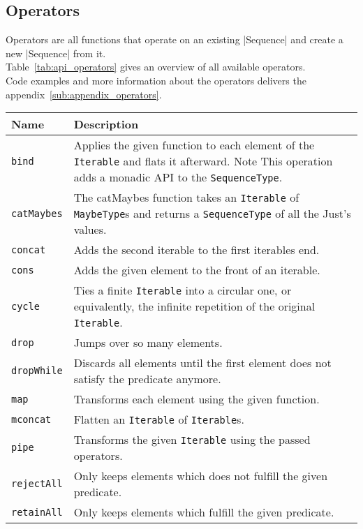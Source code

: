 \subsection{Operators} %
\label{sub:Operators}
Operators are all functions that operate on an existing |Sequence| and create a
new |Sequence| from it. \\
Table~\ref{tab:api_operators} gives an overview of all available operators.\\
Code examples and more information about the operators delivers the
appendix~\ref{sub:appendix_operators}.
\begin{table}[H]
  \centering
  \begin{tabularx}{\textwidth}{| l | X |} \hline
    \textbf{Name} & \textbf{Description} \\ \hline
    \texttt{bind} & Applies the given function to each element of the \texttt{Iterable} and flats it afterward. Note This operation adds a monadic API to the \texttt{SequenceType}. \\ \hline 
    \texttt{catMaybes} & The catMaybes function takes an \texttt{Iterable} of \texttt{MaybeType}s and returns a \texttt{SequenceType} of all the Just's values. \\ \hline 
    \texttt{concat} & Adds the second iterable to the first iterables end. \\ \hline 
    \texttt{cons} & Adds the given element to the front of an iterable. \\ \hline 
    \texttt{cycle} & Ties a finite \texttt{Iterable} into a circular one, or equivalently, the infinite repetition of the original \texttt{Iterable}. \\ \hline 
    \texttt{drop} & Jumps over so many elements. \\ \hline 
    \texttt{dropWhile} & Discards all elements until the first element does not satisfy the predicate anymore. \\ \hline 
    \texttt{map} & Transforms each element using the given function. \\ \hline 
    \texttt{mconcat} & Flatten an \texttt{Iterable} of \texttt{Iterable}s. \\ \hline 
    \texttt{pipe} & Transforms the given \texttt{Iterable} using the passed operators. \\ \hline 
    \texttt{rejectAll} & Only keeps elements which does not fulfill the given predicate. \\ \hline 
    \texttt{retainAll} & Only keeps elements which fulfill the given predicate. \\ \hline 

\end{tabularx}
\end{table}
